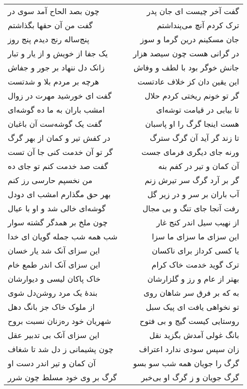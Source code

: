 \begin{center}
\begin{longtable}{l p{0.5cm} r}
چون بصد الحاح آمد سوی در
&&
گفت آخر چیست ای جان پدر
\\
گفت من آن حقها بگذاشتم
&&
ترک کردم آنچ می‌پنداشتم
\\
پنج‌ساله رنج دیدم پنج روز
&&
جان مسکینم درین گرما و سوز
\\
یک جفا از خویش و از یار و تبار
&&
در گرانی هست چون سیصد هزار
\\
زانک دل ننهاد بر جور و جفاش
&&
جانش خوگر بود با لطف و وفاش
\\
هرچه بر مردم بلا و شدتست
&&
این یقین دان کز خلاف عادتست
\\
گفت ای خورشید مهرت در زوال
&&
گر تو خونم ریختی کردم حلال
\\
امشب باران به ما ده گوشه‌ای
&&
تا بیابی در قیامت توشه‌ای
\\
گفت یک گوشه‌ست آن باغبان
&&
هست اینجا گرگ را او پاسبان
\\
در کفش تیر و کمان از بهر گرگ
&&
تا زند گر آید آن گرگ سترگ
\\
گر تو آن خدمت کنی جا آن تست
&&
ورنه جای دیگری فرمای جست
\\
گفت صد خدمت کنم تو جای ده
&&
آن کمان و تیر در کفم بنه
\\
من نخسپم حارسی رز کنم
&&
گر بر آرد گرگ سر تیرش زنم
\\
بهر حق مگذارم امشب ای دودل
&&
آب باران بر سر و در زیر گل
\\
گوشه‌ای خالی شد و او با عیال
&&
رفت آنجا جای تنگ و بی مجال
\\
چون ملخ بر همدگر گشته سوار
&&
از نهیب سیل اندر کنج غار
\\
شب همه شب جمله گویان ای خدا
&&
این سزای ما سزای ما سزا
\\
این سزای آنک شد یار خسان
&&
یا کسی کرداز برای ناکسان
\\
این سزای آنک اندر طمع خام
&&
ترک گوید خدمت خاک کرام
\\
خاک پاکان لیسی و دیوارشان
&&
بهتر از عام و رز و گلزارشان
\\
بندهٔ یک مرد روشن‌دل شوی
&&
به که بر فرق سر شاهان روی
\\
از ملوک خاک جز بانگ دهل
&&
تو نخواهی یافت ای پیک سبل
\\
شهریان خود ره‌زنان نسبت بروح
&&
روستایی کیست گیج و بی فتوح
\\
این سزای آنک بی تدبیر عقل
&&
بانگ غولی آمدش بگزید نقل
\\
چون پشیمانی ز دل شد تا شغاف
&&
زان سپس سودی ندارد اعتراف
\\
آن کمان و تیر اندر دست او
&&
گرگ را جویان همه شب سو بسو
\\
گرگ بر وی خود مسلط چون شرر
&&
گرگ جویان و ز گرگ او بی‌خبر

\end{longtable}
\end{center}

